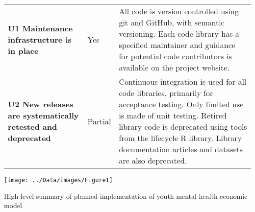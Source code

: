 \documentclass[sn-vancouver,Numbered,pdflatex]{sn-jnl}
\theoremstyle{remark}
\theoremstyle{definition}
\let\origfigure\figure
\begin{document}
\begin{table}
\begin{tabular}[t]{>{\raggedright\arraybackslash}p{10em}l>{\raggedright\arraybackslash}p{35em}}
\textbf{U1 Maintenance infrastructure is in place} & Yes & All code is version controlled using git and GitHub, with semantic versioning. Each code library has a specified maintainer and guidance for potential code contributors is available on the project website.\\
\addlinespace
\textbf{U2 New releases are systematically retested and deprecated} & Partial & Continuous integration is used for all code libraries, primarily for acceptance testing. Only limited use is made of unit testing. Retired library code is deprecated using tools from the lifecycle R library. Library documentation articles and datasets are also deprecated.\\
\bottomrule
\end{tabular}
\end{table}

\newpage

\bgroup 
    \origfigure[H]

\texttt{[image: ../Data/images/Figure1]} \caption{High level summary of planned implementation of youth mental health economic model}\label{fig:fig1}

    \endfigure
\egroup 
\newpage

\newpage
\appendix
{}


\end{document}
